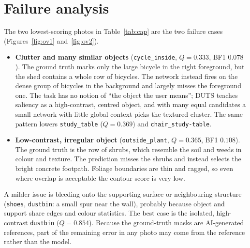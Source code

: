 \section{Failure analysis}
The two lowest-scoring photos in Table~\ref{tab:cap} are the two failure cases (Figures~\ref{fig:ov1} and~\ref{fig:ov2}).
\begin{itemize}
\item \textbf{Clutter and many similar objects} (\texttt{cycle\_inside}, $Q=0.333$, BF1 $0.078$). The ground truth marks only the large bicycle in the right foreground, but the shed contains a whole row of bicycles. The network instead fires on the dense group of bicycles in the background and largely misses the foreground one. The task has no notion of ``the object the user means''; DUTS teaches saliency as a high-contrast, centred object, and with many equal candidates a small network with little global context picks the textured cluster. The same pattern lowers \texttt{study\_table} ($Q=0.369$) and \texttt{chair\_study-table}.
\item \textbf{Low-contrast, irregular object} (\texttt{outside\_plant}, $Q=0.365$, BF1 $0.108$). The ground truth is the row of shrubs, which resemble the soil and weeds in colour and texture. The prediction misses the shrubs and instead selects the bright concrete footpath. Foliage boundaries are thin and ragged, so even where overlap is acceptable the contour score is very low.
\end{itemize}
A milder issue is bleeding onto the supporting surface or neighbouring structure (\texttt{shoes}, \texttt{dustbin}: a small spur near the wall), probably because object and support share edges and colour statistics. The best case is the isolated, high-contrast \texttt{dustbin} ($Q=0.854$). Because the ground-truth masks are AI-generated references, part of the remaining error in any photo may come from the reference rather than the model.
